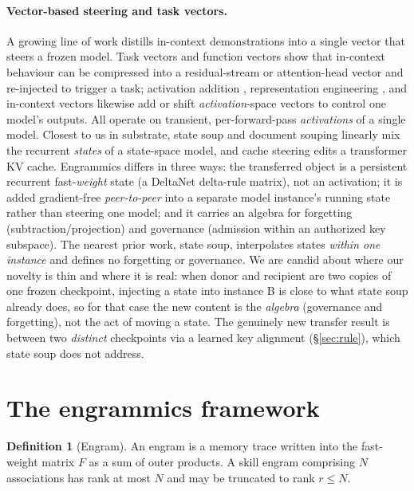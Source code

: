 \documentclass[11pt]{article}
\theoremstyle{definition}
\newtheorem{definition}{Definition}
\newcommand{\F}{F}
\begin{document}
\paragraph{Vector-based steering and task vectors.}
A growing line of work distills in-context demonstrations into a single vector that steers a frozen model. Task vectors \cite{hendel2023taskvec} and function vectors \cite{todd2024funcvec} show that in-context behaviour can be compressed into a residual-stream or attention-head vector and re-injected to trigger a task; activation addition \cite{turner2023actadd}, representation engineering \cite{zou2023repe}, and in-context vectors \cite{liu2024icv} likewise add or shift \emph{activation}-space vectors to control one model's outputs. All operate on transient, per-forward-pass \emph{activations} of a single model. Closest to us in substrate, state soup \cite{pioro2024statesoup} and document souping \cite{jafari2025soup} linearly mix the recurrent \emph{states} of a state-space model, and cache steering \cite{belitsky2025cachesteer} edits a transformer KV cache. Engrammics differs in three ways: the transferred object is a persistent recurrent fast-\emph{weight} state (a DeltaNet delta-rule matrix), not an activation; it is added gradient-free \emph{peer-to-peer} into a separate model instance's running state rather than steering one model; and it carries an algebra for forgetting (subtraction/projection) and governance (admission within an authorized key subspace). The nearest prior work, state soup, interpolates states \emph{within one instance} and defines no forgetting or governance. We are candid about where our novelty is thin and where it is real: when donor and recipient are two copies of one frozen checkpoint, injecting a state into instance B is close to what state soup already does, so for that case the new content is the \emph{algebra} (governance and forgetting), not the act of moving a state. The genuinely new transfer result is between two \emph{distinct} checkpoints via a learned key alignment (\S\ref{sec:rule}), which state soup does not address.

\section{The engrammics framework}
\label{sec:framework}

\begin{definition}[Engram]
An engram is a memory trace written into the fast-weight matrix $\F$ as a sum of outer products. A skill engram comprising $N$ associations has rank at most $N$ and may be truncated to rank $r\le N$.
\end{definition}
\end{document}
